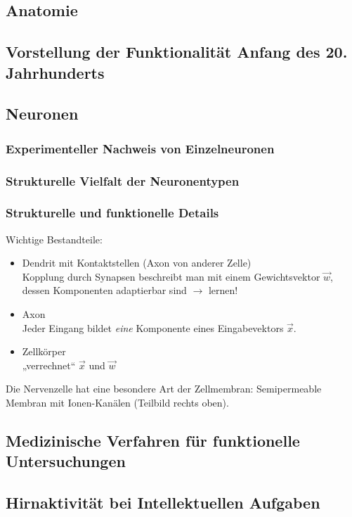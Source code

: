 \subsection{Anatomie}
\subsection{Vorstellung der Funktionalität Anfang des 20. Jahrhunderts}

\subsection{Neuronen}
\subsubsection{Experimenteller Nachweis von Einzelneuronen}
\subsubsection{Strukturelle Vielfalt der Neuronentypen}
\subsubsection{Strukturelle und funktionelle Details}
Wichtige Bestandteile:
\begin{itemize}
\item Dendrit mit Kontaktstellen (Axon von anderer Zelle)\\
Kopplung durch Synapsen beschreibt man mit einem Gewichtsvektor $\vec{w}$, dessen Komponenten adaptierbar sind $\to$ lernen!
\item Axon\\
Jeder Eingang bildet \emph{eine} Komponente eines Eingabevektors $\vec{x}$.
\item Zellkörper\\
„verrechnet“ $\vec{x}$ und $\vec{w}$
\end{itemize}
Die Nervenzelle hat eine besondere Art der Zellmembran: Semipermeable Membran mit Ionen-Kanälen (Teilbild rechts oben).

\subsection{Medizinische Verfahren für funktionelle Untersuchungen}

\subsection{Hirnaktivität bei Intellektuellen Aufgaben}

